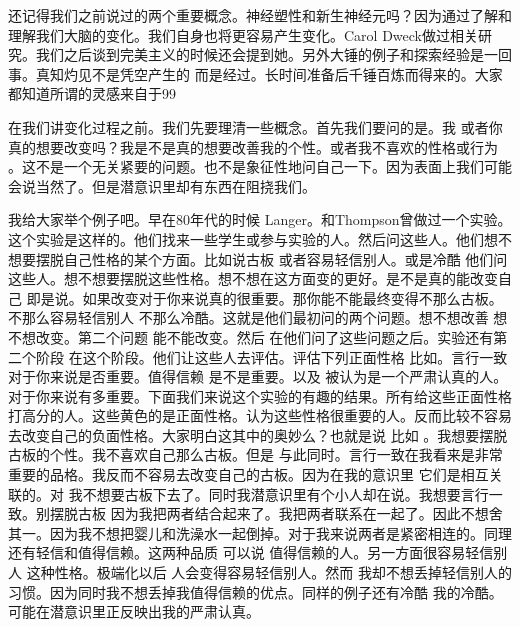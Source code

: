 还记得我们之前说过的两个重要概念。神经塑性和新生神经元吗？因为通过了解和理解我们大脑的变化。我们自身也将更容易产生变化。Carol Dweck做过相关研究。我们之后谈到完美主义的时候还会提到她。另外大锤的例子和探索经验是一回事。真知灼见不是凭空产生的 而是经过。长时间准备后千锤百炼而得来的。大家都知道所谓的灵感来自于99%

在我们讲变化过程之前。我们先要理清一些概念。首先我们要问的是。我 或者你 真的想要改变吗？我是不是真的想要改善我的个性。或者我不喜欢的性格或行为 。这不是一个无关紧要的问题。也不是象征性地问自己一下。因为表面上我们可能会说当然了。但是潜意识里却有东西在阻挠我们。 

我给大家举个例子吧。早在80年代的时候 Langer。和Thompson曾做过一个实验。这个实验是这样的。他们找来一些学生或参与实验的人。然后问这些人。他们想不想要摆脱自己性格的某个方面。比如说古板 或者容易轻信别人。或是冷酷 他们问这些人。想不想要摆脱这些性格。想不想在这方面变的更好。是不是真的能改变自己 即是说。如果改变对于你来说真的很重要。那你能不能最终变得不那么古板。不那么容易轻信别人 不那么冷酷。这就是他们最初问的两个问题。想不想改善 想不想改变。第二个问题 能不能改变。然后 在他们问了这些问题之后。实验还有第二个阶段 在这个阶段。他们让这些人去评估。评估下列正面性格 比如。言行一致对于你来说是否重要。值得信赖 是不是重要。以及 被认为是一个严肃认真的人。对于你来说有多重要。下面我们来说这个实验的有趣的结果。所有给这些正面性格打高分的人。这些黄色的是正面性格。认为这些性格很重要的人。反而比较不容易去改变自己的负面性格。大家明白这其中的奥妙么？也就是说 比如 。我想要摆脱古板的个性。我不喜欢自己那么古板。但是 与此同时。言行一致在我看来是非常重要的品格。我反而不容易去改变自己的古板。因为在我的意识里 它们是相互关联的。对 我不想要古板下去了。同时我潜意识里有个小人却在说。我想要言行一致。别摆脱古板 因为我把两者结合起来了。我把两者联系在一起了。因此不想舍其一。因为我不想把婴儿和洗澡水一起倒掉。对于我来说两者是紧密相连的。同理 还有轻信和值得信赖。这两种品质 可以说 值得信赖的人。另一方面很容易轻信别人 这种性格。极端化以后 人会变得容易轻信别人。然而 我却不想丢掉轻信别人的习惯。因为同时我不想丢掉我值得信赖的优点。同样的例子还有冷酷 我的冷酷。可能在潜意识里正反映出我的严肃认真。 

